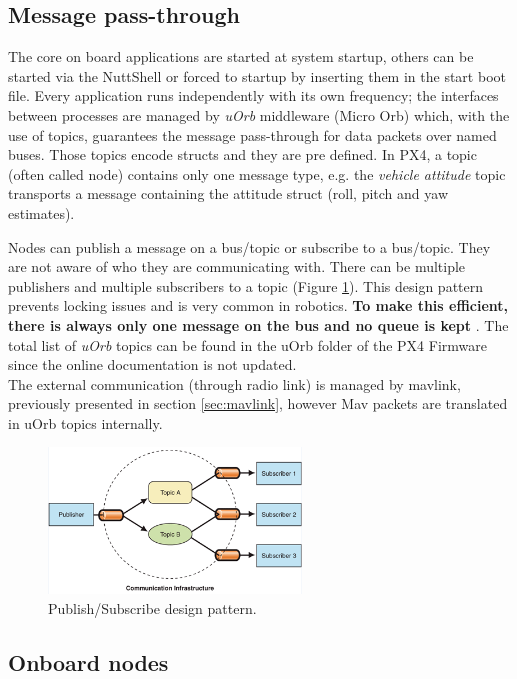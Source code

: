 \subsection{Message pass-through}
The core on board applications are started at system startup, others can be started via the NuttShell or forced to startup by inserting them in the start boot file. Every application runs independently with its own frequency; the interfaces between processes are managed by \textit{uOrb} middleware (Micro Orb) which, with the use of topics, guarantees the message pass-through for data packets over named buses. Those topics encode structs and they are pre defined. In PX4, a topic (often called node) contains only one message type, e.g. the \textit{vehicle attitude} topic transports a message containing the attitude struct (roll, pitch and yaw estimates).\par Nodes can publish a message on a bus/topic or subscribe to a bus/topic. They are not aware of who they are communicating with. There can be multiple publishers and multiple subscribers to a topic (Figure \ref{figure:pubsub}). This design pattern prevents locking issues and is very common in robotics. \textbf{To make this efficient, there is always only one message on the bus and no queue is kept} \cite{uOrb}. The total list of \textit{uOrb} topics can be found in the uOrb folder of the PX4 Firmware since the online documentation is not updated. \\

\noindent
The external communication (through radio link) is managed by mavlink, previously presented in section \ref{sec:mavlink}, however Mav packets are translated in uOrb topics internally.   

\begin{figure}[h]
	\centering
	\noindent
	\includegraphics[width=0.6\textwidth]{pub_sub.PNG}
	\caption{Publish/Subscribe design pattern.}
	\label{figure:pubsub}
\end{figure}

\subsection{Onboard nodes}


